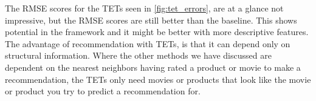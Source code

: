 The RMSE scores for the TETs seen in \autoref{fig:tet_errors}, are at a glance not impressive, but the RMSE scores are still better than the baseline. 
This shows potential in the framework and it might be better with more descriptive features. The advantage of recommendation with TETs, is that it can depend only on structural information.
Where the other methods we have discussed are dependent on the nearest neighbors having rated a product or movie to make a recommendation, the TETs only need movies or products that look like the movie or product you try to predict a recommendation for.

